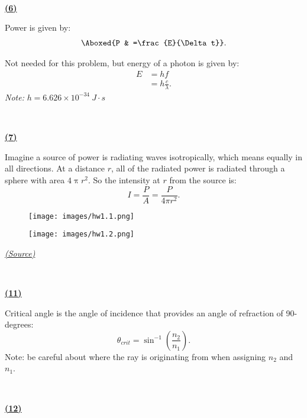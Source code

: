 \documentclass{article}
\begin{document}
\


\hline

\textbf{\underline{(6)}}

Power is given by:
\begin{align*}
\Aboxed{P & =\frac{E}{\Delta t}} .
\end{align*}


Not needed for this problem, but energy of a photon is given by:
\begin{align*}
E & =hf\\
 & =h\frac{c}{\lambda } .
\end{align*}
\textit{Note: }$h=6.626\times 10^{-34} \ J\cdot s$

\



\hline

\textbf{\underline{(7)}}

Imagine a source of power is radiating waves isotropically, which means equally in all directions. At a distance $r$, all of the radiated power is radiated through a sphere with area $4\uppi r^{2}$. So the intensity at $r$ from the source is:
\begin{equation*}
\boxed{I=\frac{P}{A} =\frac{P}{4\pi r^{2}}} .
\end{equation*}

\begin{figure}[htp]
    \centering
    \texttt{[image: images/hw1.1.png]}
\end{figure}


\begin{figure}[htp]
    \centering
    \texttt{[image: images/hw1.2.png]}
\end{figure}

\textit{\href{https://www.animations.physics.unsw.edu.au/jw/waves\_power.htm}{(Source)}}


\


\hline

\textbf{\underline{(11)}}

Critical angle is the angle of incidence that provides an angle of refraction of 90-degrees:
\begin{equation*}
\boxed{\theta _{crit} =\sin^{-1}\left(\frac{n_{2}}{n_{1}}\right)} .
\end{equation*}
Note: be careful about where the ray is originating from when assigning $n_{2}$ and $n_{1}$.


\clearpage
\

\hline

\textbf{\underline{(12)}}
\end{document}
